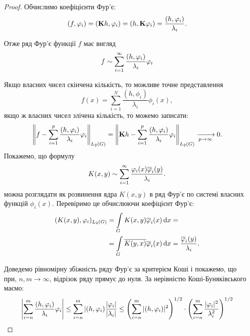 \begin{proof}
	Обчислимо коефіцієнти Фур'є:
	\begin{equation}
		(f, \phi_i) = (\bf{K}h, \phi_i) = (h, \bf{K}\phi_i) = \frac{(h,\phi_i)}{\lambda_i}.
	\end{equation}

	Отже ряд Фур'є функції $f$ має вигляд 
	\begin{equation}
		f \sim \Sum_{i = 1}^\infty \dfrac{(h, \phi_i)}{\lambda_i} \phi_i
	\end{equation}

	Якщо власних чисел скінчена кількість, то можливе точне представлення 
	\begin{equation}
		f(x) = \sum_{i=1}^N \frac{(h, \phi_i)}{\lambda_i} \phi_i(x),
	\end{equation}
	якщо ж власних чисел злічена кількість, то  можемо записати:
	\begin{equation}
		\left\| f - \Sum_{i = 1}^p \dfrac{(h, \phi_i)}{\lambda_i} \phi_i \right\|_{L_2(G)} = \left\| \bf{K}h - \Sum_{i = 1}^p \dfrac{(h, \phi_i)}{\lambda_i} \phi_i \right\|_{L_2(G)} \xrightarrow[p \to \infty]{}0.
	\end{equation}
	Покажемо, що формулу 
	\begin{equation}
		K(x, y) \sim \Sum_{i = 1}^\infty \dfrac{\phi_i(x) \overline \phi_i(y)}{\lambda_i}.
	\end{equation}
	можна розглядати як розвинення ядра $K(x, y)$ в ряд Фур'є по системі власних функцій $\phi_i(x)$. Перевіримо це обчислюючи коефіцієнт Фур'є:
	\begin{equation}
		\begin{aligned}
			(K(x, y),\phi_i)_{L_2(G)} &= \Int_G K(x, y) \overline \phi_i(x) \diff x = \\
			&= \Int_G \overline {K(y, x)} \overline \phi_i(x) \diff x = \dfrac{\overline \phi_i(y)}{\lambda_i}.
		\end{aligned}
	\end{equation}

	Доведемо рівномірну збіжність ряду Фур'є за критерієм Коші і покажемо, що при, $n, m \to \infty$, відрізок ряду прямує до нуля. За нерівністю Коші-Буняківського маємо:
	\begin{equation}
		\left| \Sum_{i = n}^m \dfrac{(h, \phi_i)}{\lambda_i} \phi_i \right| \le \Sum_{i = n}^m |(h, \phi_i)\dfrac{|\phi_i|}{|\lambda_i|} \le \left(\Sum_{i=n}^m |(h, \phi_i)|^2\right)^{1/2} \cdot \left(\Sum_{i=n}^m \dfrac{|\phi_i|^2}{\lambda_i^2}\right)^{1/2}
	\end{equation}


\end{proof}
